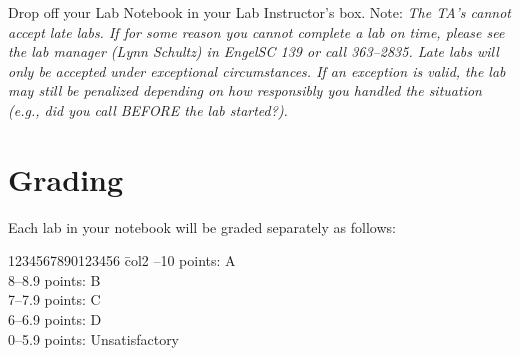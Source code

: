 
Drop off your Lab Notebook in your Lab Instructor's box. 
Note: {\em The TA's cannot accept late labs. If for some reason you
cannot complete a lab on time, please see the lab manager (Lynn Schultz) in EngelSC 139 or call
363--2835. Late labs will only be accepted under exceptional circumstances.
If an exception is valid, the lab may still be penalized depending on how
responsibly you handled the situation (e.g., did you call BEFORE the lab 
started?).}

\section*{Grading}

Each lab in your notebook will be graded separately as follows: \\
\begin{tabbing}
1234567890123456 \= col2 --10 points: \> A \\
8--8.9 points: \> B \\
7--7.9 points: \> C \\
6--6.9 points: \> D \\
0--5.9 points: \> Unsatisfactory \\
\end{tabbing}


\begin{figure}[hbt]
\end{figure}
\clearpage
\begin{figure}[hbt]
\end{figure}
\clearpage

